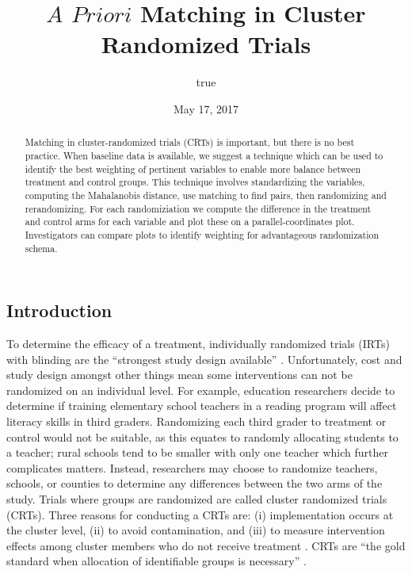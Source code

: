 \documentclass[]{sagej}
\title{\(A\) \(Priori\) Matching in Cluster Randomized Trials}
\author{true}
\date{May 17, 2017}
\begin{document}
\maketitle
\begin{abstract}
Matching in cluster-randomized trials (CRTs) is important, but there is
no best practice. When baseline data is available, we suggest a
technique which can be used to identify the best weighting of pertinent
variables to enable more balance between treatment and control groups.
This technique involves standardizing the variables, computing the
Mahalanobis distance, use matching to find pairs, then randomizing and
rerandomizing. For each randomiziation we compute the difference in the
treatment and control arms for each variable and plot these on a
parallel-coordinates plot. Investigators can compare plots to identify
weighting for advantageous randomization schema.
\end{abstract}

\subsection{Introduction}\label{introduction}

To determine the efficacy of a treatment, individually randomized trials
(IRTs) with blinding are the ``strongest study design available''
\citep{gatsonis2017methods}. Unfortunately, cost and study design
amongst other things mean some interventions can not be randomized on an
individual level. For example, education researchers decide to determine
if training elementary school teachers in a reading program will affect
literacy skills in third graders. Randomizing each third grader to
treatment or control would not be suitable, as this equates to randomly
allocating students to a teacher; rural schools tend to be smaller with
only one teacher which further complicates matters. Instead, researchers
may choose to randomize teachers, schools, or counties to determine any
differences between the two arms of the study. Trials where groups are
randomized are called cluster randomized trials (CRTs). Three reasons
for conducting a CRTs are: (i) implementation occurs at the cluster
level, (ii) to avoid contamination, and (iii) to measure intervention
effects among cluster members who do not receive treatment
\citep{balzer2012match, CRTrials2009}. CRTs are ``the gold standard when
allocation of identifiable groups is necessary''
\citep{murray2004design}.
\end{document}

